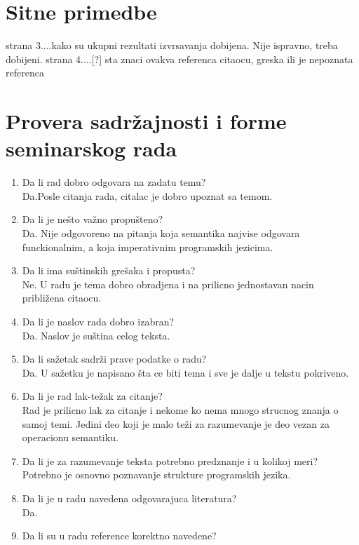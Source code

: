 \documentclass[a4paper]{report}
\begin{document}
\section{Sitne primedbe}
strana 3....kako su ukupni rezultati izvrsavanja dobijena. Nije ispravno, treba dobijeni.
strana 4....[?] sta znaci ovakva referenca citaocu, greska ili je nepoznata referenca


\section{Provera sadržajnosti i forme seminarskog rada}

\begin{enumerate}
\item Da li rad dobro odgovara na zadatu temu?\\
Da.Posle citanja rada, citalac je dobro upoznat sa temom.
\item Da li je nešto važno propušteno?\\
Da. Nije odgovoreno na pitanja koja semantika najvise odgovara funckionalnim, a koja imperativnim programskih jezicima.
\item Da li ima suštinskih grešaka i propusta?\\
Ne. U radu je tema dobro obradjena i na prilicno jednostavan nacin približena citaocu.
\item Da li je naslov rada dobro izabran?\\
Da. Naslov je suština celog teksta.
\item Da li sažetak sadrži prave podatke o radu?\\
Da. U sažetku je napisano šta ce biti tema i sve je dalje u tekstu pokriveno.
\item Da li je rad lak-težak za citanje?\\
Rad je prilicno lak za citanje i nekome ko nema mnogo strucnog znanja o samoj temi. Jedini deo koji je malo teži za razumevanje je deo vezan za operacionu semantiku.
\item Da li je za razumevanje teksta potrebno predznanje i u kolikoj meri?\\
Potrebno je osnovno poznavanje strukture programskih jezika.
\item Da li je u radu navedena odgovarajuca literatura?\\
Da.
\item Da li su u radu reference korektno navedene?\\

\end{enumerate}
\end{document}
